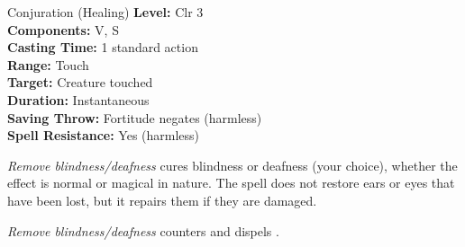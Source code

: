 {Conjuration (Healing)}
{
	\textbf{Level:}
	Clr 3\\
	\textbf{Components:}
	V, S\\
	\textbf{Casting Time:}
	1 standard action\\
	\textbf{Range:}
	Touch\\
	\textbf{Target:}
	Creature touched\\
	\textbf{Duration:}
	Instantaneous\\
	\textbf{Saving Throw:}
	Fortitude negates (harmless)\\
	\textbf{Spell Resistance:}
	Yes (harmless)\\
}
{
	\emph{Remove blindness/deafness} cures blindness or deafness (your choice), whether the effect is normal or magical in nature. The spell does not restore ears or eyes that have been lost, but it repairs them if they are damaged.

	\emph{Remove blindness/deafness} counters and dispels .

}
